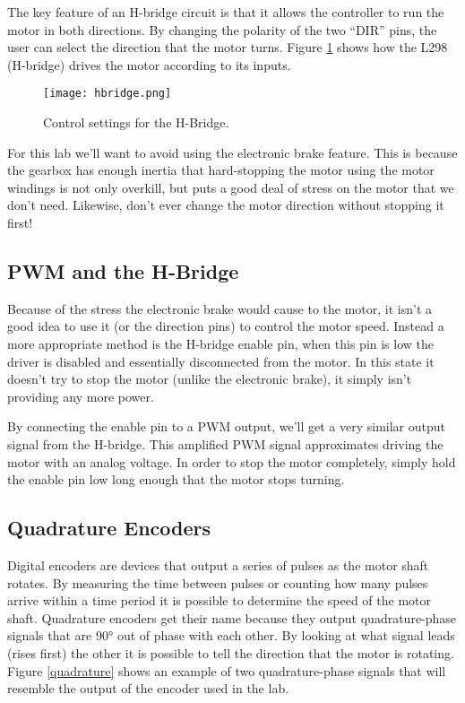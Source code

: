 \documentclass[openany,11pt,fleqn]{book} %
\begin{document}
The key feature of an H-bridge circuit is that it allows the controller to run the motor in both directions. By changing the polarity of the two ``DIR'' pins, the user can select the direction that the motor turns. Figure \ref{hbridge} shows how the L298 (H-bridge) drives the motor according to its inputs.

\begin{figure}[b]
    \centering\texttt{[image: hbridge.png]}
    \caption{Control settings for the H-Bridge.}
    \label{hbridge}
\end{figure}

For this lab we'll want to avoid using the electronic brake feature. This is because the gearbox has enough inertia that hard-stopping the motor using the motor windings is not only overkill, but puts a good deal of stress on the motor that we don't need. Likewise, don't ever change the motor direction without stopping it first! 

\subsection{PWM and the H-Bridge}
Because of the stress the electronic brake would cause to the motor, it isn't a good idea to use it (or the direction pins) to control the motor speed. Instead a more appropriate method is the H-bridge enable pin, when this pin is low the driver is disabled and essentially disconnected from the motor. In this state it doesn't try to stop the motor (unlike the electronic brake), it simply isn't providing any more power.

\noindent By connecting the enable pin to a PWM output, we'll get a very similar output signal from the H-bridge. This amplified PWM signal approximates driving the motor with an analog voltage. In order to stop the motor completely, simply hold the enable pin low long enough that the motor stops turning. 

\subsection{Quadrature Encoders}

Digital encoders are devices that output a series of pulses as the motor shaft rotates. By measuring the time between pulses or counting how many pulses arrive within a time period it is possible to determine the speed of the motor shaft. Quadrature encoders get their name because they output quadrature-phase signals that are 90° out of phase with each other. By looking at what signal leads (rises first) the other it is possible to tell the direction that the motor is rotating. Figure \ref{quadrature} shows an example of two quadrature-phase signals that will resemble the output of the encoder used in the lab.
\end{document}
